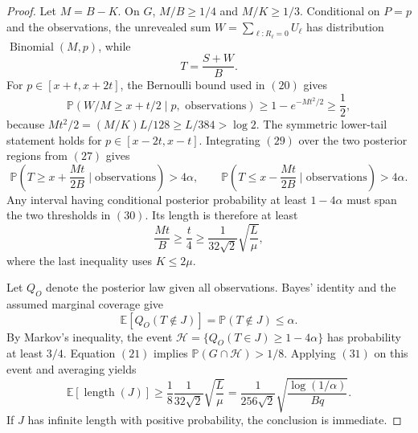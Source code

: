 \documentclass{article}
\begin{document}
\begin{proof}
Let \(M=B-K\). On \(G\), \(M/B\ge1/4\) and \(M/K\ge1/3\). Conditional on \(P=p\) and the observations, the unrevealed sum \(W=\sum_{\ell:R_\ell=0}U_\ell\) has distribution \(\operatorname{Binomial}(M,p)\), while
\[
T=\frac{S+W}{B}.
\tag{28}
\]
For \(p\in[x+t,x+2t]\), the Bernoulli bound used in \((20)\) gives
\[
\mathbb P(W/M\ge x+t/2\mid p,\text{ observations})
\ge1-e^{-Mt^2/2}
\ge\frac12,
\tag{29}
\]
because \(Mt^2/2=(M/K)L/128\ge L/384>\log2\). The symmetric lower-tail statement holds for \(p\in[x-2t,x-t]\). Integrating \((29)\) over the two posterior regions from \((27)\) gives
\[
\mathbb P\left(T\ge x+\frac{Mt}{2B}\mid\text{observations}\right)>4\alpha,
\qquad
\mathbb P\left(T\le x-\frac{Mt}{2B}\mid\text{observations}\right)>4\alpha.
\tag{30}
\]
Any interval having conditional posterior probability at least \(1-4\alpha\) must span the two thresholds in \((30)\). Its length is therefore at least
\[
\frac{Mt}{B}\ge\frac{t}{4}\ge\frac{1}{32\sqrt2}\sqrt{\frac{L}{\mu}},
\tag{31}
\]
where the last inequality uses \(K\le2\mu\).

Let \(Q_O\) denote the posterior law given all observations. Bayes' identity and the assumed marginal coverage give
\[
\mathbb E[Q_O(T\notin J)]=\mathbb P(T\notin J)\le\alpha.
\tag{32}
\]
By Markov's inequality, the event \(\mathcal H=\{Q_O(T\in J)\ge1-4\alpha\}\) has probability at least \(3/4\). Equation \((21)\) implies \(\mathbb P(G\cap\mathcal H)>1/8\). Applying \((31)\) on this event and averaging yields
\[
\mathbb E[\operatorname{length}(J)]
\ge\frac18\frac{1}{32\sqrt2}\sqrt{\frac{L}{\mu}}
=\frac{1}{256\sqrt2}\sqrt{\frac{\log(1/\alpha)}{Bq}}.
\]
If \(J\) has infinite length with positive probability, the conclusion is immediate.
\end{proof}
\end{document}
